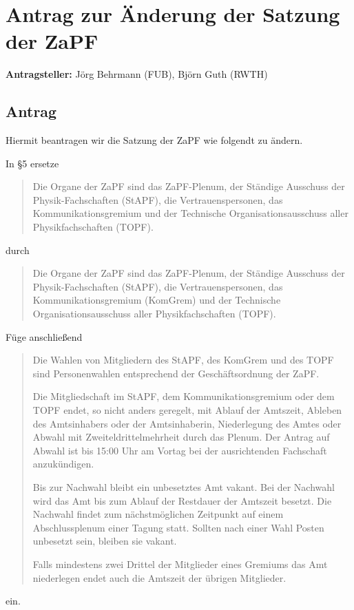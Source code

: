 \documentclass[draft,10pt,oneside]{scrartcl}
\begin{document}
\section*{Antrag zur Änderung der Satzung der ZaPF}

\textbf{Antragsteller:} Jörg Behrmann (FUB), Björn Guth (RWTH)

\subsection*{Antrag}

Hiermit beantragen wir die Satzung der ZaPF wie folgendt zu ändern.

In §5 ersetze
\begin{quote}
	Die Organe der ZaPF sind das ZaPF-Plenum, der Ständige Ausschuss der
	Physik-Fachschaften (StAPF), die Vertrauenspersonen, das Kommunikationsgremium
	und der Technische Organisationsausschuss aller Physikfachschaften (TOPF).
\end{quote}
durch
\begin{quote}
	Die Organe der ZaPF sind das ZaPF-Plenum, der Ständige Ausschuss der
	Physik-Fachschaften (StAPF), die Vertrauenspersonen, das Kommunikationsgremium
	(KomGrem) und der Technische Organisationsausschuss aller Physikfachschaften
	(TOPF).
\end{quote}

Füge anschließend
\begin{quote}
	Die Wahlen von Mitgliedern des StAPF, des KomGrem und des TOPF sind
	Personenwahlen entsprechend der Geschäftsordnung der ZaPF.

	Die Mitgliedschaft im StAPF, dem Kommunikationsgremium oder dem TOPF endet, so
	nicht anders geregelt, mit Ablauf der Amtszeit, Ableben des Amtsinhabers oder
	der Amtsinhaberin, Niederlegung des Amtes oder Abwahl mit Zweiteldrittelmehrheit
	durch das Plenum. Der Antrag auf Abwahl ist bis 15:00 Uhr am Vortag bei der
	ausrichtenden Fachschaft anzukündigen.

	Bis zur Nachwahl bleibt ein unbesetztes Amt vakant. Bei der Nachwahl wird das
	Amt bis zum Ablauf der Restdauer der Amtszeit besetzt.
	Die Nachwahl findet zum nächstmöglichen Zeitpunkt auf einem Abschlussplenum
	einer Tagung statt.
	Sollten nach einer Wahl Posten unbesetzt sein, bleiben sie vakant.

	Falls mindestens zwei Drittel der Mitglieder eines Gremiums das Amt niederlegen
	endet auch die Amtszeit der übrigen Mitglieder.
\end{quote}
ein.
\vspace{0.25cm}
\end{document}

